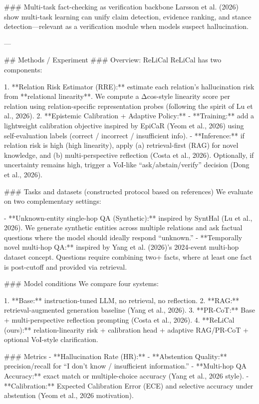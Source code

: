 ### Multi-task fact-checking as verification backbone  
Larsson et al. (2026) show multi-task learning can unify claim detection, evidence ranking, and stance detection—relevant as a verification module when models suspect hallucination.

---

## Methods / Experiment  
### Overview: ReLiCal  
ReLiCal has two components:

1. **Relation Risk Estimator (RRE):** estimate each relation’s hallucination risk from **relational linearity**. We compute a Δcos-style linearity score per relation using relation-specific representation probes (following the spirit of Lu et al., 2026).  
2. **Epistemic Calibration + Adaptive Policy:**  
   - **Training:** add a lightweight calibration objective inspired by EpiCaR (Yeom et al., 2026) using self-evaluation labels (correct / incorrect / insufficient info).  
   - **Inference:** if relation risk is high (high linearity), apply (a) retrieval-first (RAG) for novel knowledge, and (b) multi-perspective reflection (Costa et al., 2026). Optionally, if uncertainty remains high, trigger a VoI-like “ask/abstain/verify” decision (Dong et al., 2026).

### Tasks and datasets (constructed protocol based on references)  
We evaluate on two complementary settings:

- **Unknown-entity single-hop QA (Synthetic):** inspired by SyntHal (Lu et al., 2026). We generate synthetic entities across multiple relations and ask factual questions where the model should ideally respond “unknown.”  
- **Temporally novel multi-hop QA:** inspired by Yang et al. (2026)’s 2024-event multi-hop dataset concept. Questions require combining two+ facts, where at least one fact is post-cutoff and provided via retrieval.

### Model conditions  
We compare four systems:

1. **Base:** instruction-tuned LLM, no retrieval, no reflection.  
2. **RAG:** retrieval-augmented generation baseline (Yang et al., 2026).  
3. **PR-CoT:** Base + multi-perspective reflection prompting (Costa et al., 2026).  
4. **ReLiCal (ours):** relation-linearity risk + calibration head + adaptive RAG/PR-CoT + optional VoI-style clarification.

### Metrics  
- **Hallucination Rate (HR):** %
- **Abstention Quality:** precision/recall for “I don’t know / insufficient information.”  
- **Multi-hop QA Accuracy:** exact match or multiple-choice accuracy (Yang et al., 2026 style).  
- **Calibration:** Expected Calibration Error (ECE) and selective accuracy under abstention (Yeom et al., 2026 motivation).

